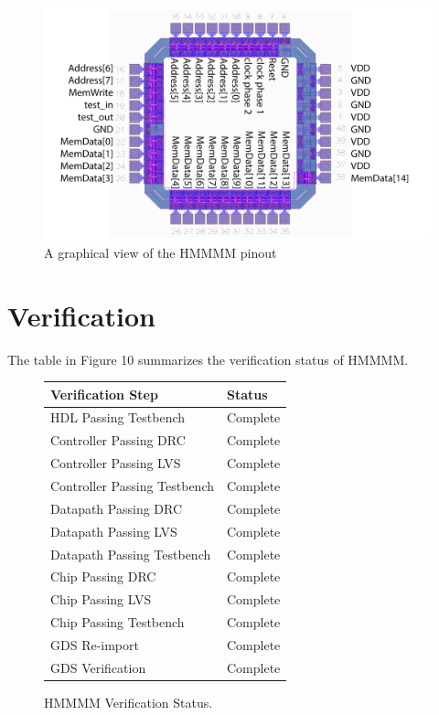 \documentclass[12pt]{article}
\begin{document}
\begin{figure}[H]
    \begin{center}
    \includegraphics[width=16cm]{pinoutgraphical.png}
    \caption{A graphical view of the HMMMM pinout}
    \end{center}
    \label{fig:pinoutgraphical}
\end{figure}

\section{Verification}

The table in Figure 10 summarizes the verification status of HMMMM.

\begin{figure}[H]
    \begin{center}
    \begin{tabular}{ll}
        Verification Step & Status \\
        \hline
        HDL Passing Testbench & Complete \\
        Controller Passing DRC & Complete \\
        Controller Passing LVS & Complete \\
        Controller Passing Testbench & Complete \\
        Datapath Passing DRC & Complete \\
        Datapath Passing LVS & Complete \\
        Datapath Passing Testbench & Complete \\
        Chip Passing DRC & Complete \\
        Chip Passing LVS & Complete \\
        Chip Passing Testbench & Complete \\
        GDS Re-import & Complete \\
        GDS Verification & Complete
    \end{tabular}
    \caption{HMMMM Verification Status.}
    \end{center}
    \label{fig:verificationstatus}
\end{figure}
\end{document}
